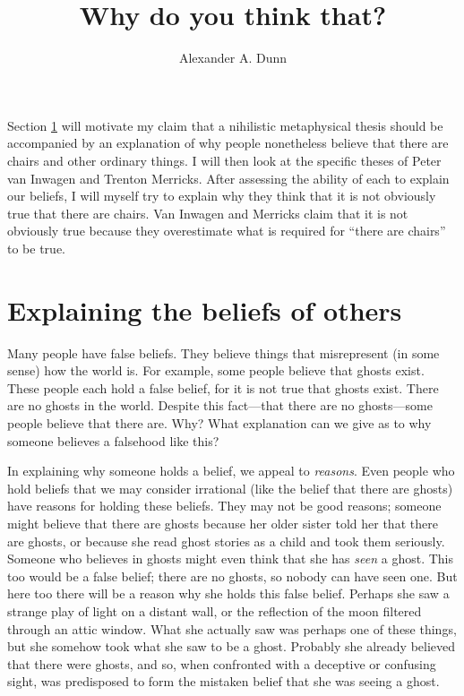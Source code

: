 \documentclass[11pt]{article}
\title{Why do you think that?}
\author{Alexander A. Dunn}
\newenvironment{inq}{\vspace{0pt}%
	\begin{list}{}%
	{\setlength\labelwidth{0pt}%
	\setlength\leftmargin{2.5\oddsidemargin}%
	\setlength\rightmargin{\leftmargin}}
	\begin{spacing}{1}
	\item[]%
	}{
	\end{spacing}
	\end{list}
	\vspace{10pt}
	}
\begin{document}
\ifstandalone
\maketitle
\begin{spacing}{1.5}
\fi
\label{stroud}


\noindent Section \ref{intro-beliefs} will motivate my claim that a
nihilistic metaphysical thesis should be accompanied by an explanation
of why people nonetheless believe that there are chairs and other
ordinary things.  I will then look at the specific theses of Peter van
Inwagen and Trenton Merricks.  After assessing the ability of each to
explain our beliefs, I will myself try to explain why they think that
it is not obviously true that there are chairs.  Van Inwagen and
Merricks claim that it is not obviously true because they overestimate
what is required for ``there are chairs'' to be true.

\section{Explaining the beliefs of others}
\label{intro-beliefs}
\noindent Many people have false beliefs.  They believe things that
misrepresent (in some sense) how the world is.  For example, some
people believe that ghosts exist.  These people each hold a false
belief, for it is not true that ghosts exist.  There are no ghosts in
the world.  Despite this fact---that there are no ghosts---some people
believe that there are.  Why?  What explanation can we give as to why
someone believes a falsehood like this?

In explaining why someone holds a belief, we appeal to {\em reasons}.
Even people who hold beliefs that we may consider irrational (like the
belief that there are ghosts) have reasons for holding these beliefs.
They may not be good reasons; someone might believe that there are
ghosts because her older sister told her that there are ghosts, or
because she read ghost stories as a child and took them seriously.
Someone who believes in ghosts might even think that she has {\em
  seen} a ghost.  This too would be a false belief; there are no
ghosts, so nobody can have seen one.  But here too there will be a
reason why she holds this false belief.  Perhaps she saw a strange
play of light on a distant wall, or the reflection of the moon
filtered through an attic window.  What she actually saw was perhaps
one of these things, but she somehow took what she saw to be a ghost.
Probably she already believed that there were ghosts, and so, when
confronted with a deceptive or confusing sight, was predisposed to
form the mistaken belief that she was seeing a ghost.


\end{spacing}
\end{document}
